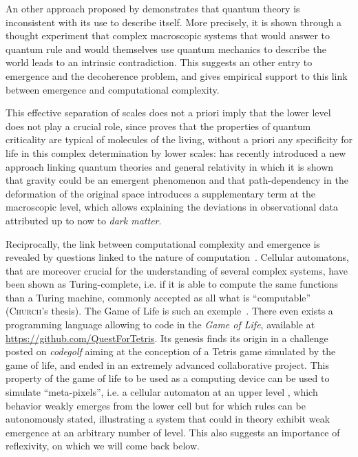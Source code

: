 \documentclass[graybox]{svmult}
\newcommand{\noun}[1]{\textsc{#1}}
\begin{document}
An other approach proposed by \cite{frauchiger2018quantum} demonstrates that quantum theory is inconsistent with its use to describe itself. More precisely, it is shown through a thought experiment that complex macroscopic systems that would answer to quantum rule and would themselves use quantum mechanics to describe the world leads to an intrinsic contradiction. This suggests an other entry to emergence and the decoherence problem, and gives empirical support to this link between emergence and computational complexity.


This effective separation of scales does not a priori imply that the lower level does not play a crucial role, since \cite{vattay2015quantum} proves that the properties of quantum criticality are typical of molecules of the living, without a priori any specificity for life in this complex determination by lower scales: \cite{2016arXiv161102269V} has recently introduced a new approach linking quantum theories and general relativity in which it is shown that gravity could be an emergent phenomenon and that path-dependency in the deformation of the original space introduces a supplementary term at the macroscopic level, which allows explaining the deviations in observational data attributed up to now to \emph{dark matter}.




Reciprocally, the link between computational complexity and emergence is revealed by questions linked to the nature of computation~\cite{moore2011nature}. Cellular automatons, that are moreover crucial for the understanding of several complex systems, have been shown as Turing-complete, i.e. if it is able to compute the same functions than a Turing machine, commonly accepted as all what is ``computable'' (\noun{Church}'s thesis). The Game of Life is such an exemple~\cite{beer2004autopoiesis}. There even exists a programming language allowing to code in the \emph{Game of Life}, available at \url{https://github.com/QuestForTetris}. Its genesis finds its origin in a challenge posted on \emph{codegolf} aiming at the conception of a Tetris game simulated by the game of life, and ended in an extremely advanced collaborative project. This property of the game of life to be used as a computing device can be used to simulate ``meta-pixels'', i.e. a cellular automaton at an upper level \cite{todesco2013cellular}, which behavior weakly emerges from the lower cell but for which rules can be autonomously stated, illustrating a system that could in theory exhibit weak emergence at an arbitrary number of level. This also suggests an importance of reflexivity, on which we will come back below.
\end{document}
